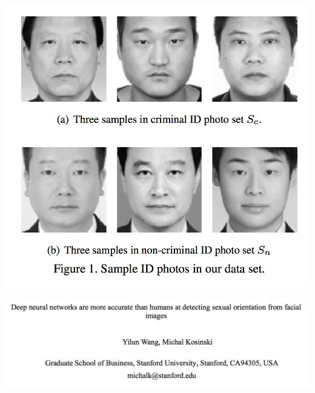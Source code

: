 \begin{frame}
	\begin{center}
		\includegraphics[height=0.6\textheight]{criminality2}
	\end{center}
\end{frame}

\begin{frame}
	\begin{center}
		\includegraphics[width=\textwidth]{orientation1}
	\end{center}
\end{frame}

